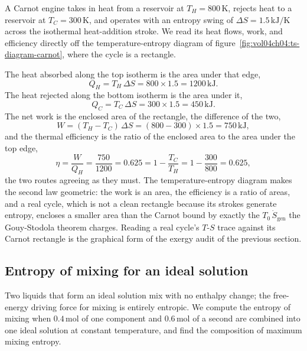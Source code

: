 A Carnot engine takes in heat from a reservoir at $T_H = 800\,\si{\kelvin}$,
rejects heat to a reservoir at $T_C = 300\,\si{\kelvin}$, and operates
with an entropy swing of $\Delta S = 1.5\,\si{\kilo\joule\per\kelvin}$
across the isothermal heat-addition stroke. We read its heat flows, work,
and efficiency directly off the temperature-entropy diagram of
figure~\ref{fig:vol04ch04:ts-diagram-carnot}, where the cycle is a
rectangle.

The heat absorbed along the top isotherm is the area under that edge,
\[
Q_H = T_H\,\Delta S = 800 \times 1.5 = 1200\,\text{kJ}.
\]
The heat rejected along the bottom isotherm is the area under it,
\[
Q_C = T_C\,\Delta S = 300 \times 1.5 = 450\,\text{kJ}.
\]
The net work is the enclosed area of the rectangle, the difference of the
two,
\[
W = (T_H - T_C)\,\Delta S = (800 - 300)\times 1.5 = 750\,\text{kJ},
\]
and the thermal efficiency is the ratio of the enclosed area to the area
under the top edge,
\[
\eta = \frac{W}{Q_H} = \frac{750}{1200} = 0.625
= 1 - \frac{T_C}{T_H} = 1 - \frac{300}{800} = 0.625,
\]
the two routes agreeing as they must. The temperature-entropy diagram
makes the second law geometric: the work is an area, the efficiency is a
ratio of areas, and a real cycle, which is not a clean rectangle because
its strokes generate entropy, encloses a smaller area than the Carnot
bound by exactly the $T_0\,\dot S_{\text{gen}}$ the Gouy-Stodola theorem
charges. Reading a real cycle's $T$-$S$ trace against its Carnot rectangle
is the graphical form of the exergy audit of the previous section.

\subsection{Entropy of mixing for an ideal solution}

Two liquids that form an ideal solution mix with no enthalpy change; the
free-energy driving force for mixing is entirely entropic. We compute the
entropy of mixing when $0.4\,\text{mol}$ of one component and
$0.6\,\text{mol}$ of a second are combined into one ideal solution at
constant temperature, and find the composition of maximum mixing entropy.

